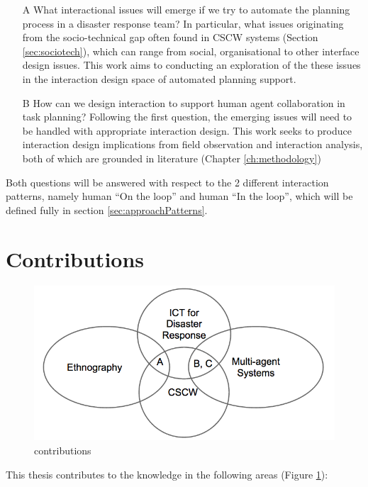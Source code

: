 \begin{enumerate}
\item[A] What interactional issues will emerge if we try to automate the planning process in a disaster response team? In particular, what issues originating from the socio-technical gap often found in \ac{CSCW} systems (Section \ref{sec:sociotech}), which can range from social, organisational to other interface design issues. This work aims to conducting an exploration of the these issues in the interaction design space of automated planning support.

\item[B] How can we design interaction to support human agent collaboration in task planning?
Following the first question, the emerging issues will need to be handled with appropriate interaction design. This work seeks to produce interaction design implications from field observation and interaction analysis, both of which are grounded in literature (Chapter \ref{ch:methodology})
\end{enumerate}

Both questions will be answered with respect to the 2 different interaction patterns, namely human ``On the loop'' and human ``In the loop'', which will be defined fully in section \ref{sec:approachPatterns}. 

\section{Contributions} 
\begin{figure}[h]
  \centering
  \includegraphics[scale=0.5]{img/introduction/contributions.png}
  \caption{contributions}
  \label{fig:contributions}
\end{figure}


This thesis contributes to the knowledge in the following areas (Figure \ref{fig:contributions}): \\


